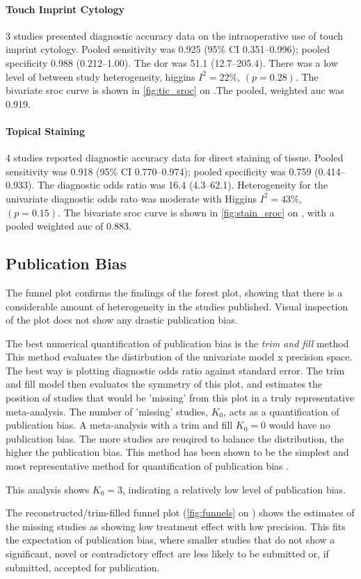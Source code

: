\paragraph{Touch Imprint Cytology}

3 studies presented diagnostic accuracy data on the intraoperative use of touch imprint cytology.
Pooled sensitivity was 0.925 (95\% CI 0.351--0.996); pooled specificity 0.988 (0.212--1.00).
The \gls{dor} was 51.1 (12.7--205.4).
There was a low level of between study heterogeneity, higgins $I^2 = 22\%$, $(p=0.28)$.
The bivariate \gls{sroc} curve is shown in \cref{fig:tic_sroc} on .The pooled, weighted \gls{auc} was 0.919.

\paragraph{Topical Staining}

4 studies reported diagnostic accuracy data for direct staining of tissue.
Pooled sensitivity was 0.918 (95\% CI 0.770--0.974); pooled specificity was 0.759 (0.414--0.933).
The diagnostic odds ratio was 16.4 (4.3--62.1).
Heterogeneity for the univariate diagnostic odds rato was moderate with Higgins $I^2 = 43\%$, $(p=0.15)$.
The bivariate \gls{sroc} curve is shown in \cref{fig:stain_sroc} on , with a pooled weighted \gls{auc} of 0.883.


\subsection{Publication Bias}

The funnel plot confirms the findings of the forest plot, showing that there is a considerable amount of heterogeneity in the studies published.
Visual inspection of the plot does not show any drastic publication bias.

The best numerical quantification of publication bias is the \emph{trim and fill} method \cite{duvalTrimFillSimple2000}
This method evaluates the distirbution of the univariate model x precision space.
The best way is plotting diagnostic odds ratio against standard error.
The trim and fill model then evaluates the symmetry of this plot, and estimates the position of studies that would be 'missing' from this plot in a truly representative meta-analysis.
The number of 'missing' studies, $K_0$, acts as a quantification of publication bias.
A meta-analysis with a trim and fill $K_0 = 0$ would have no publication bias.
The more studies are reuqired to balance the distribution, the higher the publication bias.
This method has been shown to be the simplest and most representative method for quantification of publication bias \cite{burknerTestingPublicationBias2014}.


This analysis shows $K_0 = 3$, indicating a relatively low level of publication bias.

The reconstructed/trim-filled funnel plot (\cref{fig:funnels} on ) shows the estimates of the missing studies as showing low treatment effect with low precision.
This fits the expectation of publication bias, where smaller studies that do not show a significant, novel or contradictory effect are less likely to be submitted or, if submitted, accepted for publication.
